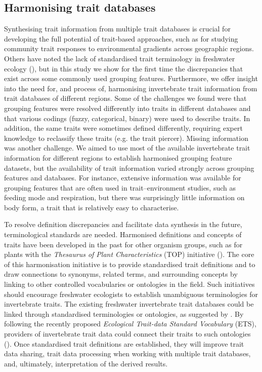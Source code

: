\documentclass[12pt]{article}
\begin{document}
\subsection*{Harmonising trait databases}

Synthesising trait information from multiple trait databases is crucial for developing the full potential of trait-based approaches, such as for studying community trait responses to environmental gradients across geographic regions. Others have noted the lack of standardised trait terminology in freshwater ecology (\cite{baird_toward_2011, brink_traits-based_2011}), but in this study we show for the first time the discrepancies that exist across some commonly used grouping features. Furthermore, we offer insight into the need for, and process of, harmonising invertebrate trait information from trait databases of different regions. Some of the challenges we found were that grouping features were resolved differently into traits in different databases and that various codings (fuzzy, categorical, binary) were used to describe traits. In addition, the same traits were sometimes defined differently, requiring expert knowledge to reclassify these traits (e.g. the trait piercer). Missing information was another challenge. We aimed to use most of the available invertebrate trait information for different regions to establish harmonised grouping feature datasets, but the availability of trait information varied strongly across grouping features and databases. For instance, extensive information was available for grouping features that are often used in trait–environment studies, such as feeding mode and respiration, but there was surprisingly little information on body form, a trait that is relatively easy to characterise.

To resolve definition discrepancies and facilitate data synthesis in the future, terminological standards are needed. Harmonised definitions and concepts of traits have been developed in the past for other organism groups, such as for plants with the \textit{Thesaurus of Plant Characteristics} (TOP) initiative (\cite{garnier_towards_2017}). The core of this harmonisation initiative is to provide standardised trait definitions and to draw connections to synonyms, related terms, and surrounding concepts by linking to other controlled vocabularies or ontologies in the field. Such initiatives should encourage freshwater ecologists to establish unambiguous terminologies for invertebrate traits. The existing freshwater invertebrate trait databases could be linked through standardised terminologies or ontologies, as suggested by \citet{baird_toward_2011}. By following the recently proposed \textit{Ecological Trait-data Standard Vocabulary} (ETS), providers of invertebrate trait data could connect their traits to such ontologies (\cite{schneider_towards_2019}). Once standardised trait definitions are established, they will improve trait data sharing, trait data processing when working with multiple trait databases, and, ultimately, interpretation of the derived results. 
\end{document}
